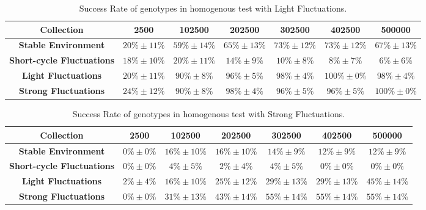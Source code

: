 \begin{table}
\caption{Success Rate of genotypes in homogenous test with Light Fluctuations.\label{tab:scslight}}
\scriptsize
\begin{tabular}{ccccccc}
\toprule%
{\textbf{Collection}} & {\textbf{2500}} & \textbf{102500} & \textbf{202500} &\textbf{302500} &\textbf{402500} &\textbf{500000} \tabularnewline
\toprule%

\textbf{Stable Environment} & $20\%\pm11\%$ & $59\%\pm14\%$ & $65\%\pm13\%$ & $73\%\pm12\%$ & $73\%\pm12\%$ & $67\%\pm13\%$\tabularnewline
\textbf{Short-cycle Fluctuations} & $18\%\pm10\%$ & $20\%\pm11\%$ & $14\%\pm9\%$ & $10\%\pm8\%$ & $8\%\pm7\%$ & $6\%\pm6\%$\tabularnewline
\textbf{Light Fluctuations} &$20\%\pm11\%$ & $90\%\pm8\%$ & $96\%\pm5\%$ & $98\%\pm4\%$ & $100\%\pm0\%$ & $98\%\pm4\%$\tabularnewline
\textbf{Strong Fluctuations} &$24\%\pm12\%$ & $90\%\pm8\%$ & $98\%\pm4\%$ & $96\%\pm5\%$ & $96\%\pm5\%$ & $100\%\pm0\%$\tabularnewline

\bottomrule%
\end{tabular}%
\end{table} 

\begin{table}
\caption{Success Rate of genotypes in homogenous test with Strong Fluctuations.\label{tab:scstrong}}
\scriptsize
\begin{tabular}{ccccccc}
\toprule%
{\textbf{Collection}} & {\textbf{2500}} & \textbf{102500} & \textbf{202500} &\textbf{302500} &\textbf{402500} &\textbf{500000} \tabularnewline
\toprule%

\textbf{Stable Environment} & $0\%\pm0\%$ & $16\%\pm10\%$ & $16\%\pm10\%$ & $14\%\pm9\%$ & $12\%\pm9\%$ & $12\%\pm9\%$\tabularnewline
\textbf{Short-cycle Fluctuations} & $0\%\pm0\%$ & $4\%\pm5\%$ & $2\%\pm4\%$ & $4\%\pm5\%$ & $0\%\pm0\%$ & $0\%\pm0\%$\tabularnewline
\textbf{Light Fluctuations} & $2\%\pm4\%$ & $16\%\pm10\%$ & $25\%\pm12\%$ & $29\%\pm13\%$ & $29\%\pm13\%$ & $45\%\pm14\%$\tabularnewline
\textbf{Strong Fluctuations} & $0\%\pm0\%$ & $31\%\pm13\%$ & $43\%\pm14\%$ & $55\%\pm14\%$ & $55\%\pm14\%$ & $55\%\pm14\%$\tabularnewline

\bottomrule%
\end{tabular}%
\end{table} 



